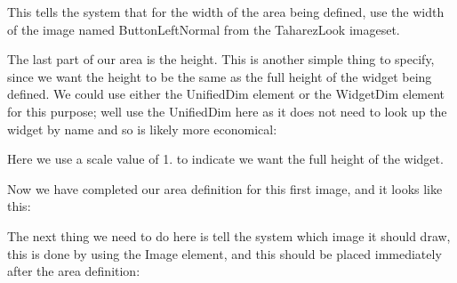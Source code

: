 This tells the system that for the width of the area being defined, use the width of the image named Button\+Left\+Normal from the Taharez\+Look imageset.

The last part of our area is the height. This is another simple thing to specify, since we want the height to be the same as the full height of the widget being defined. We could use either the Unified\+Dim element or the Widget\+Dim element for this purpose; we\textquotesingle{}ll use the Unified\+Dim here as it does not need to look up the widget by name and so is likely more economical\+:


\begin{DoxyCode}{0}
\DoxyCodeLine{}
\DoxyCodeLine{}
\end{DoxyCode}


Here we use a scale value of 1. to indicate we want the full height of the widget.

Now we have completed our area definition for this first image, and it looks like this\+: 
\begin{DoxyCode}{0}
\DoxyCodeLine{      />}
\end{DoxyCode}


The next thing we need to do here is tell the system which image it should draw, this is done by using the Image element, and this should be placed immediately after the area definition\+: 
\begin{DoxyCode}{0}
\end{DoxyCode}


